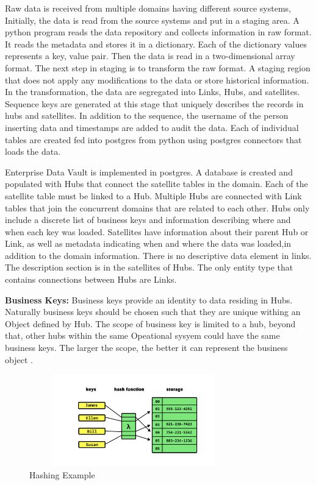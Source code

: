 \documentclass[conference]{IEEEtran}
\begin{document}
Raw data is received from multiple domains having different source systems, Initially, the data is read from the source systems and put in a staging area. A python program reads the data repository and collects information in raw format. It reads the metadata and stores it in a dictionary. Each of the dictionary values represents a key, value pair. Then the data is read in a two-dimensional array format. The next step in staging is to transform the raw format. A staging region that does not apply any modifications to the data or store historical information. In the transformation, the data are segregated into Links, Hubs, and satellites. Sequence keys are generated at this stage that uniquely describes the records in hubs and satellites. In addition to the sequence, the username of the person inserting data and timestamps are added to audit the data. Each of individual tables are created fed into postgres from python using postgres connectors that loads the data.

Enterprise Data Vault is implemented in postgres. A database is created and populated with Hubs that connect the satellite tables in the domain. Each of the satellite table must be linked to a Hub. Multiple Hubs are connected with Link tables that join the concurrent domains that are related to each other. Hubs only include a discrete list of business keys and information describing where and when each key was loaded. Satellites have information about their parent Hub or Link, as well as metadata indicating when and where the data was loaded,in addition to the domain information. There is no descriptive data element in links. The description section is in the satellites of Hubs. The only entity type that contains connections between Hubs are Links.

\smallskip
\noindent
\textbf{Business Keys:} Business keys provide an identity to data residing in Hubs. Naturally business keys should be chosen such that they are unique withing an Object defined by Hub. The scope of business key is limited to a hub, beyond that, other hubs within the same Opeational sysyem could have the same business keys. The larger the scope, the better it can represent the business object \cite{b3}.

\begin{figure}[htbp]
\centerline{\includegraphics[width=9cm, height=4cm]{Figure4.png}}
\caption{Hashing Example}
\label{fig4}
\end{figure}
\end{document}
